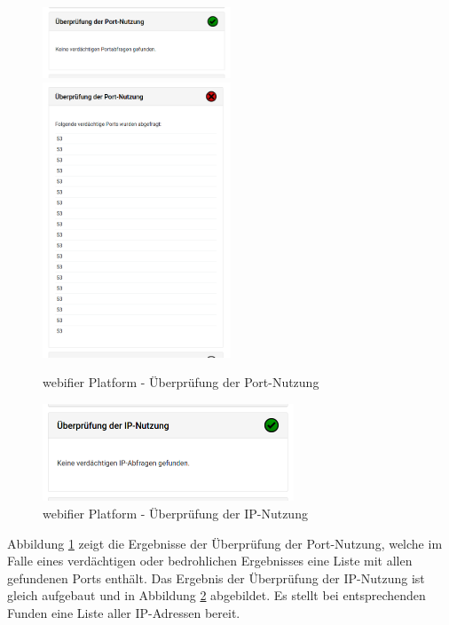 \begin{figure}[H]
\centerline{%
\includegraphics[width=0.5\textwidth]{images/platform/portscan-clean}%
\includegraphics[width=0.5\textwidth]{images/platform/portscan-malicious}%
}%
\caption{webifier Platform - Überprüfung der Port-Nutzung}
\label{fig:platform-result-portscan}
\end{figure}

\begin{figure}[H]
  \centering
  \includegraphics[width=7.5cm]{images/platform/ipscan-clean}
  \caption{webifier Platform - Überprüfung der IP-Nutzung}
  \label{fig:platform-result-ipscan}
\end{figure}

Abbildung \ref{fig:platform-result-portscan} zeigt die Ergebnisse der Überprüfung der Port-Nutzung, welche im Falle eines verdächtigen oder bedrohlichen Ergebnisses eine Liste mit allen gefundenen Ports enthält. Das Ergebnis der Überprüfung der IP-Nutzung ist gleich aufgebaut und in Abbildung \ref{fig:platform-result-ipscan} abgebildet. Es stellt bei entsprechenden Funden eine Liste aller IP-Adressen bereit.

